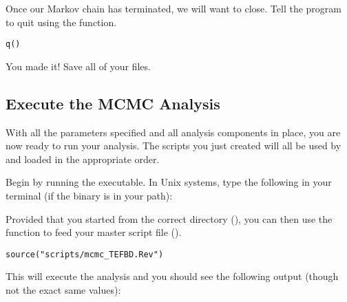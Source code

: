 Once our Markov chain has terminated, we will want \RevBayes to close. 
Tell the program to quit using the  function.
{\tt \begin{snugshade*}
\begin{lstlisting}
q()
\end{lstlisting}
\end{snugshade*}}

{\begin{framed}
You made it! Save all of your files.
\end{framed}}

\bigskip
\subsection{Execute the MCMC Analysis}\label{subsect:Exercise-RunMCMC}

With all the parameters specified and all analysis components in place, you are now ready to run your analysis. 
The \Rev scripts you just created will all be used by \RevBayes and loaded in the appropriate order.

{\begin{framed}
Begin by running the \RevBayes executable. In Unix systems, type the following in your terminal (if the \RevBayes binary is in your path):

\colorbox{black}{\strut\hspace{1mm}\textcolor[rgb]{0,1,1}{}\hspace{0.925\textwidth}}
\end{framed}}

Provided that you started \RevBayes from the correct directory (), you can then use the  function to feed \RevBayes your master script file ().
{\tt \begin{snugshade*}
\begin{lstlisting}
source("scripts/mcmc_TEFBD.Rev")
\end{lstlisting}
\end{snugshade*}}

This will execute the analysis and you should see the following output (though not the exact same values):


